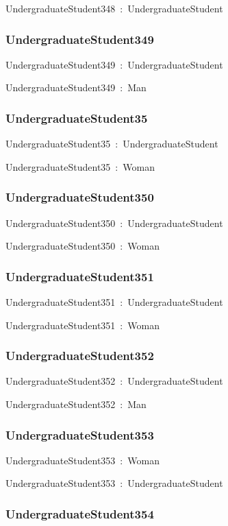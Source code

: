 \documentclass{article}
\begin{document}
UndergraduateStudent348~:~UndergraduateStudent

\subsubsection*{UndergraduateStudent349}

UndergraduateStudent349~:~UndergraduateStudent

UndergraduateStudent349~:~Man

\subsubsection*{UndergraduateStudent35}

UndergraduateStudent35~:~UndergraduateStudent

UndergraduateStudent35~:~Woman

\subsubsection*{UndergraduateStudent350}

UndergraduateStudent350~:~UndergraduateStudent

UndergraduateStudent350~:~Woman

\subsubsection*{UndergraduateStudent351}

UndergraduateStudent351~:~UndergraduateStudent

UndergraduateStudent351~:~Woman

\subsubsection*{UndergraduateStudent352}

UndergraduateStudent352~:~UndergraduateStudent

UndergraduateStudent352~:~Man

\subsubsection*{UndergraduateStudent353}

UndergraduateStudent353~:~Woman

UndergraduateStudent353~:~UndergraduateStudent

\subsubsection*{UndergraduateStudent354}
\end{document}
